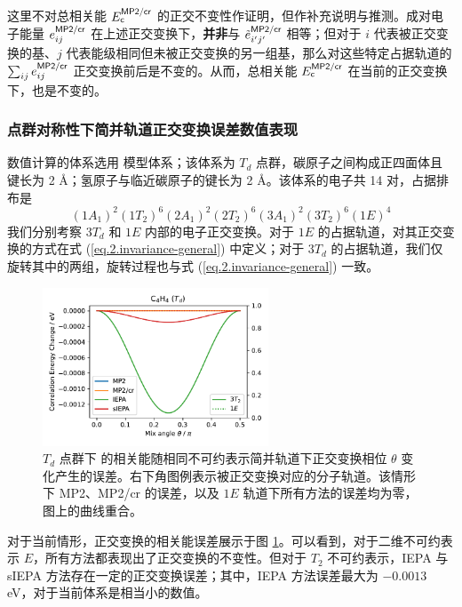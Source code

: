 这里不对总相关能 $E_{\textsf{c}}^{\textsf{MP2/cr}}$ 的正交不变性作证明，但作补充说明与推测。成对电子能量 $e_{ij}^{\textsf{MP2/cr}}$ 在上述正交变换下，\textbf{并非}与 $\tilde{e}_{i'j'}^{\textsf{MP2/cr}}$ 相等；但对于 $i$ 代表被正交变换的基、$j$ 代表能级相同但未被正交变换的另一组基，那么对这些特定占据轨道的 $\sum_{ij} e_{ij}^{\textsf{MP2/cr}}$ 正交变换前后是不变的。从而，总相关能 $E_{\textsf{c}}^{\textsf{MP2/cr}}$ 在当前的正交变换下，也是不变的。

\subsubsection{点群对称性下简并轨道正交变换误差数值表现}

数值计算的体系选用  模型体系；该体系为 $T_d$ 点群，碳原子之间构成正四面体且键长为 2 \AA；氢原子与临近碳原子的键长为 2 \AA。该体系的电子共 14 对，占据排布是
$$
(1 A_1)^2 (1 T_2)^6 (2 A_1)^2 (2 T_2)^6 (3 A_1)^2 (3 T_2)^6 (1 E)^4
$$
我们分别考察 $3 T_d$ 和 $1 E$ 内部的电子正交变换。对于 $1E$ 的占据轨道，对其正交变换的方式在式 (\ref{eq.2.invariance-general}) 中定义；对于 $3 T_d$ 的占据轨道，我们仅旋转其中的两组，旋转过程也与式 (\ref{eq.2.invariance-general}) 一致。

\begin{figure}[!ht]
  \centering
  \includegraphics[width=0.6\textwidth]{assets/invar-sep-C4H4-1.pdf}
  \caption[$T_d$ 点群下  对称性简并轨道正交变换误差]{$T_d$ 点群下  的相关能随相同不可约表示简并轨道下正交变换相位 $\theta$ 变化产生的误差。右下角图例表示被正交变换对应的分子轨道。该情形下 MP2、MP2/cr 的误差，以及 $1E$ 轨道下所有方法的误差均为零，图上的曲线重合。}
  \label{fig.2.invar-sep-C4H4-1}
\end{figure}

对于当前情形，正交变换的相关能误差展示于图 \ref{fig.2.invar-sep-C4H4-1}。可以看到，对于二维不可约表示 $E$，所有方法都表现出了正交变换的不变性。但对于 $T_2$ 不可约表示，IEPA 与 sIEPA 方法存在一定的正交变换误差；其中，IEPA 方法误差最大为 $-0.0013$ eV，对于当前体系是相当小的数值。

